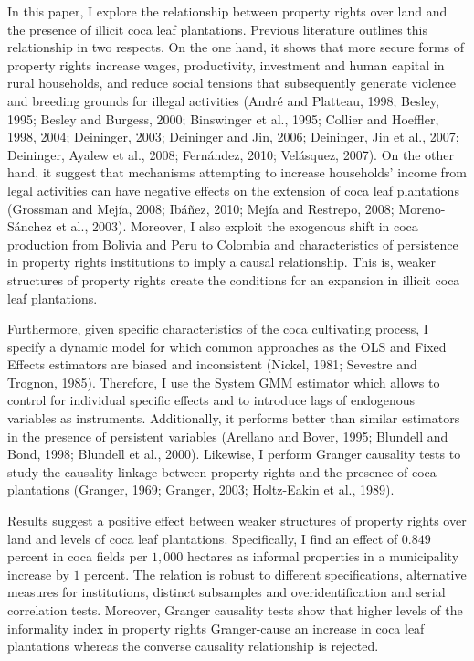 \documentclass[a4paper, 12pt]{article}
\begin{document}
In this paper, I explore the relationship between property rights over land and the presence of illicit coca leaf plantations. Previous literature outlines this relationship in two respects. On the one hand, it shows that more secure forms of property rights increase wages, productivity, investment and human capital in rural households, and reduce social tensions that subsequently generate violence and breeding grounds for illegal activities (Andr\'{e} and Platteau, 1998; Besley, 1995; Besley and Burgess, 2000; Binswinger et al., 1995; Collier and Hoeffler, 1998, 2004; Deininger, 2003; Deininger and Jin, 2006; Deininger, Jin et al., 2007; Deininger, Ayalew et al., 2008; Fern\'{a}ndez, 2010; Vel\'{a}squez, 2007). On the other hand, it suggest that mechanisms attempting to increase households' income from legal activities can have negative effects on the extension of coca leaf plantations (Grossman and Mej\'{i}a, 2008; Ib\'{a}\~{n}ez, 2010; Mej\'{i}a and Restrepo, 2008; Moreno-S\'{a}nchez et al., 2003). Moreover, I also exploit the exogenous shift in coca production from Bolivia and Peru to Colombia and characteristics of persistence in property rights institutions to imply a causal relationship. This is, weaker structures of property rights create the conditions for an expansion in illicit coca leaf plantations.

Furthermore, given specific characteristics of the coca cultivating process, I specify a dynamic model for which common approaches as the OLS and Fixed Effects estimators are biased and inconsistent (Nickel, 1981; Sevestre and Trognon, 1985). Therefore, I use the System GMM estimator which allows to control for individual specific effects and to introduce lags of endogenous variables as instruments. Additionally, it performs better than similar estimators in the presence of persistent variables (Arellano and Bover, 1995; Blundell and Bond, 1998; Blundell et al., 2000). Likewise, I perform Granger causality tests to study the causality linkage between property rights and the presence of coca plantations (Granger, 1969; Granger, 2003; Holtz-Eakin et al., 1989).

Results suggest a positive effect between weaker structures of property rights over land and levels of coca leaf plantations. Specifically, I find an effect of $0.849$ percent in coca fields per $1,000$ hectares as informal properties in a municipality increase by $1$ percent. The relation is robust to different specifications, alternative measures for institutions, distinct subsamples and overidentification and serial correlation tests. Moreover, Granger causality tests show that higher levels of the informality index in property rights Granger-cause an increase in coca leaf plantations whereas the converse causality relationship is rejected.
\end{document}
